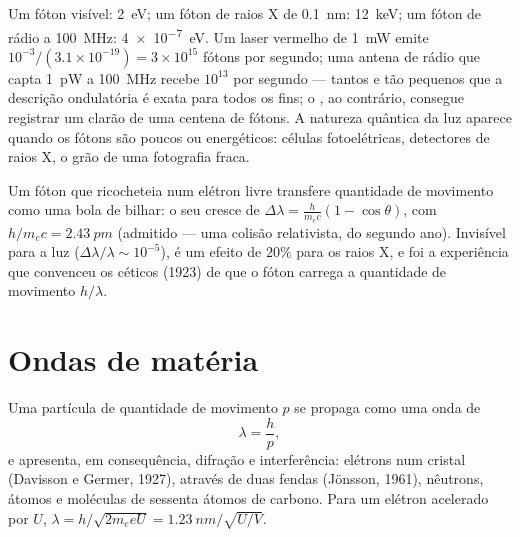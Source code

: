 \begin{example}\label{ex:b1:quantum-introduction:orders}
Um fóton visível: \qty{2}{eV}; um fóton de raios X de \qty{0.1}{nm}: \qty{12}{keV};
um fóton de rádio a \qty{100}{MHz}: \qty{4e-7}{eV}. Um laser vermelho de \qty{1}{mW}
emite $10^{-3}/(3.1 \times 10^{-19}) = 3 \times 10^{15}$ fótons por segundo;
uma antena de rádio que capta \qty{1}{pW} a \qty{100}{MHz} recebe $10^{13}$
por segundo --- tantos e tão pequenos que a descrição ondulatória é exata
para todos os fins; o , ao contrário, consegue registrar um clarão de
uma centena de fótons. A natureza quântica da luz aparece quando os fótons são
poucos ou energéticos: células fotoelétricas, detectores de raios X, o grão de
uma fotografia fraca.
\end{example}

\begin{remark}\label{rem:b1:quantum-introduction:compton}
Um fóton que ricocheteia num elétron livre transfere quantidade de movimento como uma
bola de bilhar: o seu  cresce de $\Delta\lambda = \frac{h}{m_ec}(1 -
\cos\theta)$, com $h/m_ec = \qty{2.43}{pm}$ (admitido --- uma colisão
relativista, do segundo ano). Invisível para a luz ($\Delta\lambda/\lambda \sim 10^{-5}$),
é um efeito de $20\%$ para os raios X, e foi a experiência que convenceu
os céticos (1923) de que o fóton carrega a quantidade de movimento $h/\lambda$.
\end{remark}

\section{Ondas de matéria}

\begin{theorem}[de Broglie]\label{thm:b1:quantum-introduction:debroglie}
Uma partícula de quantidade de movimento $p$ se propaga como uma onda de 
\[
\lambda = \frac{h}{p} ,
\]
e apresenta, em consequência, difração e interferência: elétrons num
cristal (Davisson e Germer, 1927), através de duas fendas (Jönsson, 1961),
nêutrons, átomos e moléculas de sessenta átomos de carbono. Para um elétron
acelerado por $U$, $\lambda = h/\sqrt{2m_eeU} = \qty{1.23}{nm}/\sqrt{U/\unit{V}}$.
\end{theorem}
\admitted


